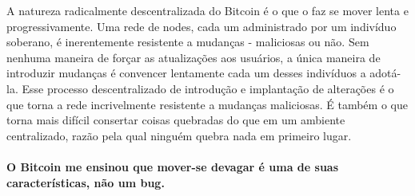 A natureza radicalmente descentralizada do Bitcoin é o que o faz se mover lenta e progressivamente. Uma rede de nodes, cada um administrado por um indivíduo soberano, é inerentemente resistente a mudanças - maliciosas ou não. Sem nenhuma maneira de forçar as atualizações aos usuários, a única maneira de introduzir mudanças é convencer lentamente cada um desses indivíduos a adotá-la. Esse processo descentralizado de introdução e implantação de alterações é o que torna a rede incrivelmente resistente a mudanças maliciosas. É também o que torna mais difícil consertar coisas quebradas do que em um ambiente centralizado, razão pela qual ninguém quebra nada em primeiro lugar.

\paragraph{O Bitcoin me ensinou que mover-se devagar é uma de suas características, não um bug.}

%
%
%
%
%
%
%
